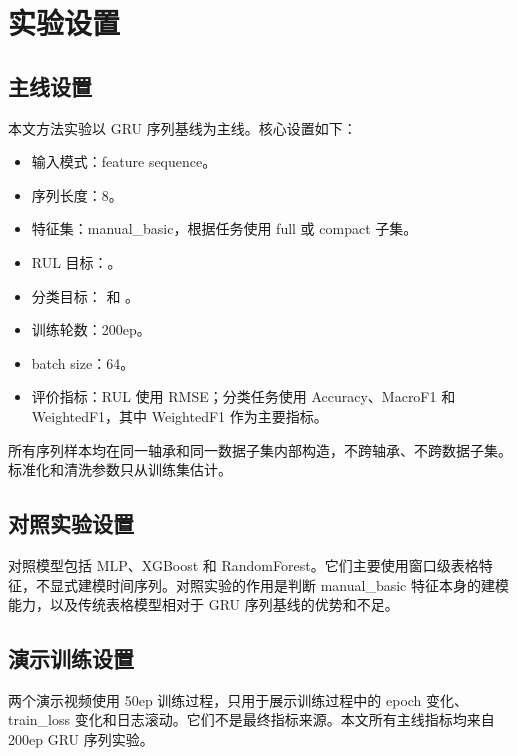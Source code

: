 \section{实验设置}

\subsection{主线设置}

本文方法实验以 GRU 序列基线为主线。核心设置如下：

\begin{itemize}
  \item 输入模式：feature sequence。
  \item 序列长度：8。
  \item 特征集：manual\_basic，根据任务使用 full 或 compact 子集。
  \item RUL 目标：。
  \item 分类目标： 和 。
  \item 训练轮数：200ep。
  \item batch size：64。
  \item 评价指标：RUL 使用 RMSE；分类任务使用 Accuracy、MacroF1 和 WeightedF1，其中 WeightedF1 作为主要指标。
\end{itemize}

所有序列样本均在同一轴承和同一数据子集内部构造，不跨轴承、不跨数据子集。标准化和清洗参数只从训练集估计。

\subsection{对照实验设置}

对照模型包括 MLP、XGBoost 和 RandomForest。它们主要使用窗口级表格特征，不显式建模时间序列。对照实验的作用是判断 manual\_basic 特征本身的建模能力，以及传统表格模型相对于 GRU 序列基线的优势和不足。



\subsection{演示训练设置}

两个演示视频使用 50ep 训练过程，只用于展示训练过程中的 epoch 变化、train\_loss 变化和日志滚动。它们不是最终指标来源。本文所有主线指标均来自 200ep GRU 序列实验。
